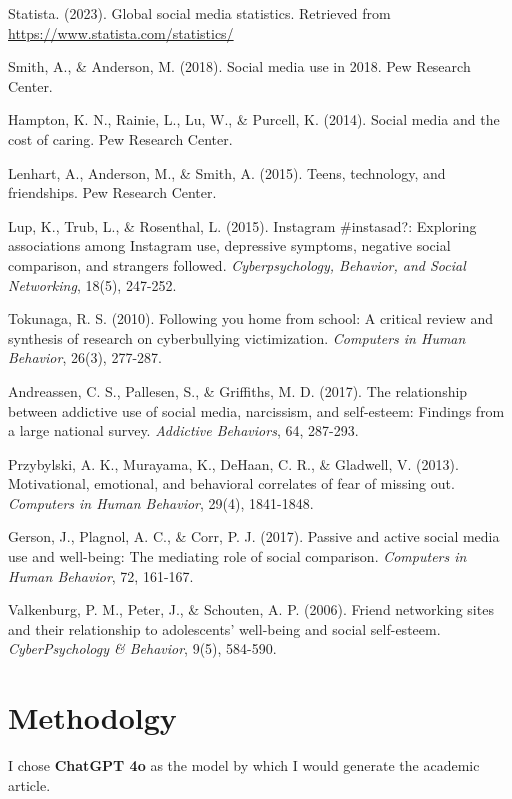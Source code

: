 \documentclass[12pt]{article}
\begin{document}
\begin{thebibliography}{9}

 Statista. (2023). Global social media statistics. Retrieved from \url{https://www.statista.com/statistics/}

 Smith, A., \& Anderson, M. (2018). Social media use in 2018. Pew Research Center.

 Hampton, K. N., Rainie, L., Lu, W., \& Purcell, K. (2014). Social media and the cost of caring. Pew Research Center.

 Lenhart, A., Anderson, M., \& Smith, A. (2015). Teens, technology, and friendships. Pew Research Center.

 Lup, K., Trub, L., \& Rosenthal, L. (2015). Instagram \#instasad?: Exploring associations among Instagram use, depressive symptoms, negative social comparison, and strangers followed. \textit{Cyberpsychology, Behavior, and Social Networking}, 18(5), 247-252.

 Tokunaga, R. S. (2010). Following you home from school: A critical review and synthesis of research on cyberbullying victimization. \textit{Computers in Human Behavior}, 26(3), 277-287.

 Andreassen, C. S., Pallesen, S., \& Griffiths, M. D. (2017). The relationship between addictive use of social media, narcissism, and self-esteem: Findings from a large national survey. \textit{Addictive Behaviors}, 64, 287-293.

 Przybylski, A. K., Murayama, K., DeHaan, C. R., \& Gladwell, V. (2013). Motivational, emotional, and behavioral correlates of fear of missing out. \textit{Computers in Human Behavior}, 29(4), 1841-1848.

 Gerson, J., Plagnol, A. C., \& Corr, P. J. (2017). Passive and active social media use and well-being: The mediating role of social comparison. \textit{Computers in Human Behavior}, 72, 161-167.

 Valkenburg, P. M., Peter, J., \& Schouten, A. P. (2006). Friend networking sites and their relationship to adolescents’ well-being and social self-esteem. \textit{CyberPsychology \& Behavior}, 9(5), 584-590.

\end{thebibliography}

\section{Methodolgy}
I chose \textbf{ChatGPT 4o} as the model by which I would generate the academic article. 
\end{document}
